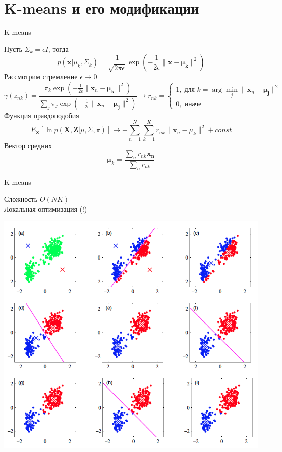 \documentclass[10pt]{beamer}
\begin{document}
\section{K-means и его модификации}

\begin{frame}{K-means}

Пусть $\Sigma_k = \epsilon I$, тогда
\[
p(\mathbf{x} | \mu_k, \Sigma_k) = \frac{1}{\sqrt{2\pi\epsilon}}\exp(-\frac{1}{2\epsilon}\|\mathbf{x}-\mathbf{\mu_k}\|^2)
\]
Рассмотрим стремление $\epsilon \rightarrow 0$
\[
\gamma(z_{nk}) = \frac{\pi_k \exp(-\frac{1}{2\epsilon}\|\mathbf{x}_n-\mathbf{\mu_k}\|^2)}{\sum_j \pi_j \exp(-\frac{1}{2\epsilon}\|\mathbf{x}_n-\mathbf{\mu_j}\|^2)} \rightarrow r_{nk} = \begin{cases}
1, \; \text{для } k = \arg \min_j \|\mathbf{x}_n - \mathbf{\mu_j}\|^2 \\
0, \; \text{иначе}
\end{cases}
\]
Функция правдоподобия
\[
E_\mathbf{Z}[\ln p(\mathbf{X}, \mathbf{Z} | \mu, \Sigma, \pi)] \rightarrow -\sum_{n=1}^N \sum_{k=1}^K r_{nk} \| \mathbf{x}_n - \mu_k \|^2 + const
\]
Вектор средних
\[
\mathbf{\mu}_k = \frac{\sum_n r_{nk} \mathbf{x_n}}{\sum_n r_{nk}} 
\]

\end{frame}

\begin{frame}{K-means}

\kmeans
Сложность $O(NK)$ \\
Локальная оптимизация (!)

\end{frame}

\begin{frame}{}

\begin{center}
\includegraphics[scale=0.35]{images/kmeans.png}
\end{center}

\end{frame}
\end{document}
